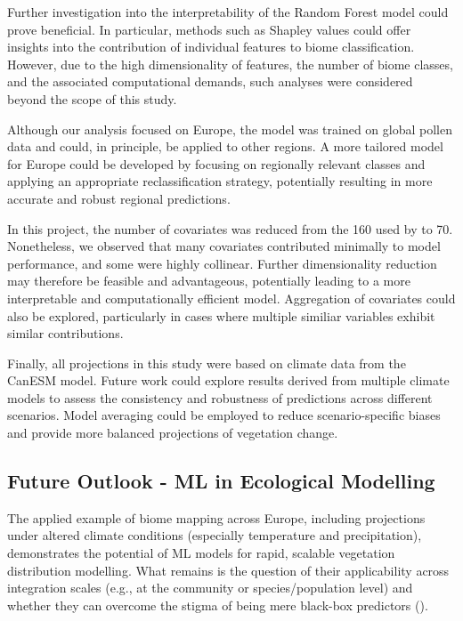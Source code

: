 \documentclass[
]{krantz}
\begin{document}
Further investigation into the interpretability of the Random Forest model could prove beneficial. In particular, methods such as Shapley values could offer insights into the contribution of individual features to biome classification. However, due to the high dimensionality of features, the number of biome classes, and the associated computational demands, such analyses were considered beyond the scope of this study.

Although our analysis focused on Europe, the model was trained on global pollen data and could, in principle, be applied to other regions. A more tailored model for Europe could be developed by focusing on regionally relevant classes and applying an appropriate reclassification strategy, potentially resulting in more accurate and robust regional predictions.

In this project, the number of covariates was reduced from the 160 used by \citet{hengl2018} to 70. Nonetheless, we observed that many covariates contributed minimally to model performance, and some were highly collinear. Further dimensionality reduction may therefore be feasible and advantageous, potentially leading to a more interpretable and computationally efficient model. Aggregation of covariates could also be explored, particularly in cases where multiple similiar variables exhibit similar contributions.

Finally, all projections in this study were based on climate data from the CanESM model. Future work could explore results derived from multiple climate models to assess the consistency and robustness of predictions across different scenarios. Model averaging could be employed to reduce scenario-specific biases and provide more balanced projections of vegetation change.

\subsection{Future Outlook - ML in Ecological Modelling}\label{future-outlook---ml-in-ecological-modelling}

The applied example of biome mapping across Europe, including projections under altered climate conditions (especially temperature and precipitation), demonstrates the potential of ML models for rapid, scalable vegetation distribution modelling. What remains is the question of their applicability across integration scales (e.g., at the community or species/population level) and whether they can overcome the stigma of being mere black-box predictors (\citet{pichler2023}).
\end{document}
